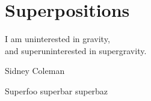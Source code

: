 \section{Superpositions}
\epigraph{I am uninterested in gravity,\\
and superuninterested in supergravity.}{Sidney Coleman\cite{vanNieuwenhuizen:2016}}

Superfoo superbar superbaz